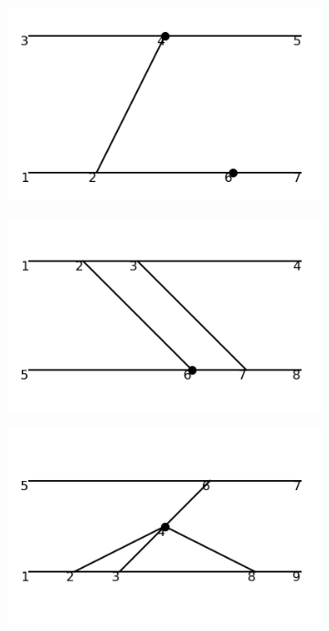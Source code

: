 \documentclass[11pt,a4paper,twoside,pdf]{article}
\numberwithin{equation}{section}
\begin{document}
\begin{figure}[h!]
\begin{subfigure}[t]{0.16\textwidth}
    \end{subfigure}
    \hfill
    \begin{subfigure}[t]{0.16\textwidth}
        \centering
        \includegraphics[width=\textwidth]{plots/order6_2to2/counterterms/13.png}
    \end{subfigure}
    \hfill
    \begin{subfigure}[t]{0.16\textwidth}
        \centering
        \includegraphics[width=\textwidth]{plots/order6_2to2/counterterms/14.png}
    \end{subfigure}
    \hfill
    \begin{subfigure}[t]{0.16\textwidth}
        \centering
        \includegraphics[width=\textwidth]{plots/order6_2to2/counterterms/15.png}

\end{subfigure}
\end{figure}
\end{document}
